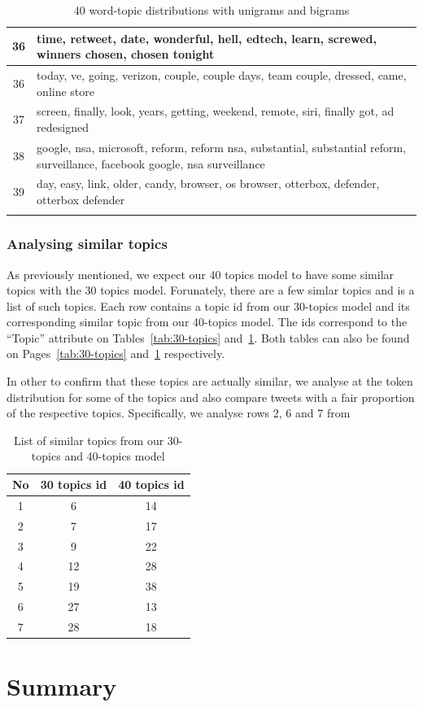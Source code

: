 \begin{longtable}{c p{16cm}}
   36   & time, retweet, date, wonderful, hell, edtech, learn, screwed, winners chosen, chosen tonight \\ \midrule
   36   & today, ve, going, verizon, couple, couple days, team couple, dressed, came, online store \\ \midrule
   37   & screen, finally, look, years, getting, weekend, remote, siri, finally got, ad redesigned \\ \midrule
   38   & google, nsa, microsoft, reform, reform nsa, substantial, substantial reform, surveillance, facebook google, nsa surveillance \\ \midrule
   39   & day, easy, link, older, candy, browser, os browser, otterbox, defender, otterbox defender \\ \bottomrule
\caption{40 word-topic distributions with unigrams and bigrams}
\label{tab:40-topics}
\end{longtable}


\subsubsection{Analysing similar topics}
\label{sec:analysing-topic-similarities}
As previously mentioned, we expect our 40 topics model to have some similar topics with the 30
topics model. Forunately, there are a few simlar topics and  is a list
of such topics. Each row contains a topic id from our 30-topics model and its corresponding similar
topic from our 40-topics model. The ids correspond to the ``Topic'' attribute on
Tables~\ref{tab:30-topics} and~\ref{tab:40-topics}. Both tables can also be found on
Pages~\ref{tab:30-topics} and~\ref{tab:40-topics} respectively.

In other to confirm that these topics are actually similar, we analyse at the token distribution
for some of the topics and also compare tweets with a fair proportion of the respective topics.
Specifically, we analyse rows 2, 6 and 7 from 

\begin{table}
  \centering
  \begin{tabular}{c c c} \toprule
    No & 30 topics id & 40 topics id \\ \midrule
    1  &     6       &    14 \\ \midrule
    2  &     7       &    17 \\ \midrule
    3  &     9       &    22 \\ \midrule
    4  &     12      &    28 \\ \midrule
    5  &     19      &    38 \\ \midrule
    6  &     27      &    13 \\ \midrule
    7  &     28      &    18 \\ \bottomrule
  \end{tabular}
  \caption{List of similar topics from our 30-topics and 40-topics model}
  \label{tab:similar-topics}
\end{table}

\newpage
\section{Summary}
\label{sec:topic-model-eval-summary}


